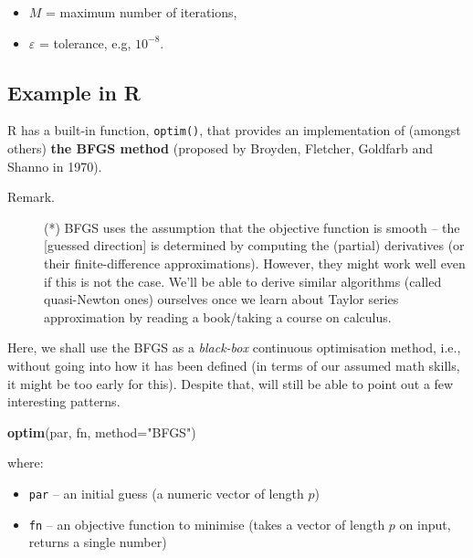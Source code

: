 \documentclass[10pt,b5paper,krantz1]{krantz}
\newenvironment{Shaded}{\begin{snugshade}}{\end{snugshade}}
\newcommand{\DataTypeTok}[1]{\textcolor[rgb]{0.27,0.27,0.27}{#1}}
\newcommand{\KeywordTok}[1]{\textcolor[rgb]{0.27,0.27,0.27}{\textbf{#1}}}
\newcommand{\NormalTok}[1]{#1}
\newcommand{\StringTok}[1]{\textcolor[rgb]{0.5,0.5,0.5}{#1}}
\providecommand{\tightlist}{%
  \setlength{\itemsep}{0pt}\setlength{\parskip}{0pt}}
\begin{document}
\begin{itemize}
\tightlist
\item
  \(M\) = maximum number of iterations,
\item
  \(\varepsilon\) = tolerance, e.g, \(10^{-8}\).
\end{itemize}

\hypertarget{example-in-r-4}{%
\subsection{Example in R}\label{example-in-r-4}}

R has a built-in function, \texttt{optim()}, that provides an implementation
of (amongst others) \textbf{the BFGS method}
(proposed by Broyden, Fletcher, Goldfarb and Shanno in 1970).

\begin{description}
\item[Remark.]
(*) BFGS uses the assumption that the objective function
is smooth -- the {[}guessed direction{]} is determined by computing
the (partial) derivatives (or their finite-difference approximations).
However, they might work well even if this is not the case.
We'll be able to derive similar algorithms (called quasi-Newton ones) ourselves
once we learn about Taylor series approximation
by reading a book/taking a course on calculus.
\end{description}

Here, we shall use the BFGS as a \emph{black-box} continuous optimisation method,
i.e., without going into how it has been defined (in terms of our assumed math
skills, it might be too early for this).
Despite that, will still be able to point out a few interesting
patterns.

\begin{Shaded}
\begin{Highlighting}[]
\KeywordTok{optim}\NormalTok{(par, fn, }\DataTypeTok{method=}\StringTok{"BFGS"}\NormalTok{)}
\end{Highlighting}
\end{Shaded}

where:

\begin{itemize}
\tightlist
\item
  \texttt{par} -- an initial guess (a numeric vector of length \(p\))
\item
  \texttt{fn} -- an objective function to minimise (takes a vector of length \(p\)
  on input, returns a single number)
\end{itemize}
\end{document}
